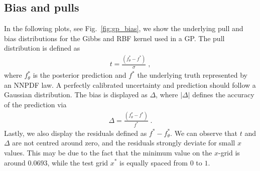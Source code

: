 \documentclass[11pt,a4paper]{article}
\begin{document}
%

\subsection{Bias and pulls}

In the following plots, see Fig.~\ref{fig:gp_bias}, we show the underlying pull and bias distributions for the Gibbs and RBF kernel used in a GP. 
The pull distribution is defined as
%
\begin{align}
    t = \frac{(f^*_\theta - f^*)}{\sigma} \; ,
\end{align}
%
where $f^*_\theta$ is the posterior prediction and $f^*$ the underlying truth represented by an NNPDF law. A perfectly calibrated uncertainty and prediction should follow a Gaussian distribution. The bias is displayed as $\Delta$, where $|\Delta|$ defines the accuracy of the prediction via
%
\begin{align}
    \Delta = \frac{(f^*_\theta - f^*)}{f^*} \; .
\end{align}
%
Lastly, we also display the residuals defined as $f^* - f^*_\theta$.
We can observe that $t$ and $\Delta$ are not centred around zero, and the residuals strongly deviate for small $x$ values. This may be due to the fact that the minimum value on the $x$-grid is around $0.0693$, while the test grid $x^*$ is equally spaced from $0$ to $1$.
\end{document}
